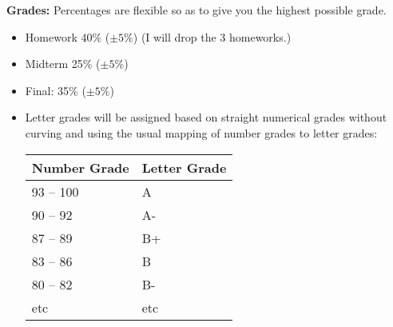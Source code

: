 \documentclass[oneside,12pt]{amsart}
\begin{document}
\bigskip

\textbf{Grades:} Percentages are flexible so as to give you the highest possible grade.
\begin{itemize}
\item Homework 40\% ($\pm5\%$) (I will drop the 3 homeworks.)
\item Midterm 25\% ($\pm5\%$)
\item Final: 35\% ($\pm5\%$)
\item Letter grades will be assigned based on straight numerical grades
without curving and using the usual mapping of number grades to letter grades:

\begin{center}
  \begin{tabular}{ | l | l |}
    \hline
    Number Grade & Letter Grade  \\ \hline \hline
    93 -- 100 & A\\ \hline
    90 -- 92 & A- \\ \hline
    87 -- 89 & B+ \\ \hline
    83 -- 86 & B \\ \hline
    80 -- 82 & B- \\ \hline
    etc & etc \\ \hline
  \end{tabular}
\end{center}

\end{itemize}
\end{document}
